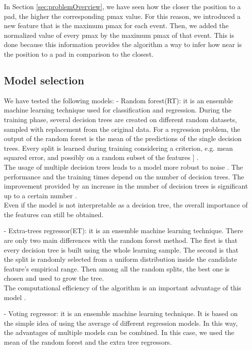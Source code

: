 \documentclass[conference]{IEEEtran}
\begin{document}
In Section \ref{sec:problemOverview}, we have seen how the closer the position to a pad, the higher the corresponding pmax value. For this reason, we introduced a new feature that is the maximum pmax for each event. Then, we added the normalized value of every pmax by the maximum pmax of that event. This is done because this information provides the algorithm a way to infer how near is the position to a pad in comparison to the closest.\\
  
 
\subsection{Model selection}
We have tested the following models:
- Random forest(RT): it is an ensemble machine learning technique used for classification and regression. During the training phase, several decision trees are created on different random datasets, sampled with replacement from the original data. For a regression problem, the output of the random forest is the mean of the predictions of the single decision trees. Every split is learned during training considering a criterion, e.g. mean squared error, and possibly on a random subset of the features 
\cite{paper:randomForest}] \cite{paper:extrRandTree}.\\
The usage of multiple decision trees leads to a model more robust to noise \cite{paper:RandomForest}. The performance and the training times depend on the number of decision trees. The improvement provided by an increase in the number of decision trees is significant up to a certain number \cite{paper:howManyTree}.\\
Even if the model is not interpretable as a decision tree, the overall importance of the features can still be obtained.

- Extra-trees regressor(ET): it is an ensemble machine learning technique. There are only two main differences with the random forest method. The first is that every decision tree is built using the whole learning sample. The second is that the split is randomly selected from a uniform distribution inside the candidate feature's empirical range. Then among all the random splits, the best one is chosen and used to grow the tree. \\
The computational efficiency of the algorithm is an important advantage of this model \cite{paper:extrRandTree}.


- Voting regressor: it is an ensemble machine learning technique. It is based on the simple idea of using the average of different regression models. In this way, the advantages of multiple models can be combined. In this case, we used the mean of the random forest and the extra tree regressors. %
\end{document}
